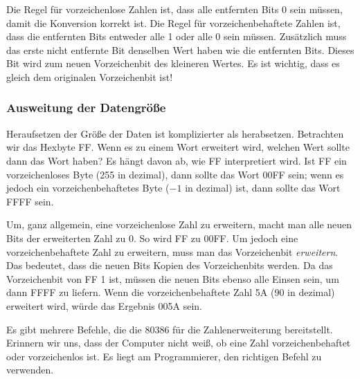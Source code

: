Die Regel f\"{u}r vorzeichenlose Zahlen ist, dass alle entfernten Bits 0
sein m\"{u}ssen, damit die Konversion korrekt ist. Die Regel f\"{u}r
vorzeichenbehaftete Zahlen ist, dass die entfernten Bits entweder
alle 1 oder alle 0 sein m\"{u}ssen. Zus\"{a}tzlich muss das erste nicht
entfernte Bit denselben Wert haben wie die entfernten Bits. Dieses
Bit wird zum neuen Vorzeichenbit des kleineren Wertes. Es ist
wichtig, dass es gleich dem originalen Vorzeichenbit ist!

\subsubsection{Ausweitung der Datengr\"{o}{\ss}e}

Heraufsetzen der Gr\"{o}{\ss}e der Daten ist komplizierter als herabsetzen.
Betrachten wir das Hexbyte FF\@. Wenn es zu einem Wort erweitert
wird, welchen Wert sollte dann das Wort haben? Es h\"{a}ngt davon ab,
wie FF interpretiert wird. Ist FF ein vorzeichenloses Byte (255 in
dezimal), dann sollte das Wort 00FF sein; wenn es jedoch ein
vorzeichenbehaftetes Byte ($-1$ in dezimal) ist, dann sollte das
Wort FFFF sein.

Um, ganz allgemein, eine vorzeichenlose Zahl zu erweitern, macht man
alle neuen Bits der erweiterten Zahl zu 0. So wird FF zu 00FF\@. Um
jedoch eine vorzeichenbehaftete Zahl zu erweitern, muss man das
Vorzeichenbit \emph{erweitern}.  Das
bedeutet, dass die neuen Bits Kopien des Vorzeichenbits werden. Da
das Vorzeichenbit von FF 1 ist, m\"{u}ssen die neuen Bits ebenso alle
Einsen sein, um dann FFFF zu liefern. Wenn die vorzeichenbehaftete
Zahl 5A (90 in dezimal) erweitert wird, w\"{u}rde das Ergebnis 005A
sein.

Es gibt mehrere Befehle, die die 80386 f\"{u}r die Zahlenerweiterung
bereitstellt. Erinnern wir uns, dass der Computer nicht wei{\ss}, ob
eine Zahl vorzeichenbehaftet oder vorzeichenlos ist. Es liegt am
Programmierer, den richtigen Befehl zu verwenden.

